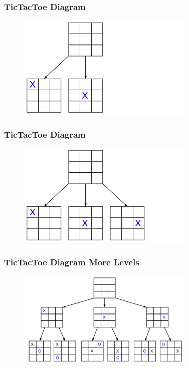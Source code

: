 \documentclass{beamer}
\begin{document}
\begin{frame}[fragile]
\frametitle{TicTacToe Diagram}
\begin{figure}[h]
	\includegraphics[width=8.5cm]{Diagrams/TicTacToe/TicTacToeTreeTwo.pdf}
	\centering
\end{figure}
\end{frame}

\begin{frame}[fragile]
\frametitle{TicTacToe Diagram}
\begin{figure}[h]
	\includegraphics[width=8.5cm]{Diagrams/TicTacToe/TicTacToeTreeThree.pdf}
	\centering
\end{figure}
\end{frame}

\begin{frame}[fragile]
\frametitle{TicTacToe Diagram More Levels}
\begin{figure}[h]
	\includegraphics[width=8.5cm]{Diagrams/TicTacToe/TicTacToeTreeMultiLevel.pdf}
	\centering
\end{figure}
\end{frame}
\end{document}
